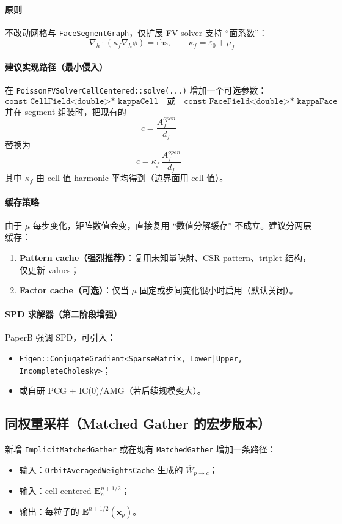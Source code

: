 \documentclass[UTF8,a4paper,12pt]{ctexart}
\newcommand{\code}[1]{\texttt{#1}}
\begin{document}
\paragraph{原则}
不改动网格与 \code{FaceSegmentGraph}，仅扩展 FV solver 支持 ``面系数''：
\[
  -\nabla_h\cdot\left( \kappa_f \nabla_h \phi \right) = \mathrm{rhs},
  \qquad \kappa_f = \varepsilon_0 + \mu_f
\]

\paragraph{建议实现路径（最小侵入）}
在 \code{PoissonFVSolverCellCentered::solve(...)} 增加一个可选参数：
\[
\code{const CellField<double>* kappaCell} \quad \text{或}\quad \code{const FaceField<double>* kappaFace}
\]
并在 segment 组装时，把现有的
\[
c=\frac{A_f^{open}}{d_f}
\]
替换为
\[
c=\kappa_f\,\frac{A_f^{open}}{d_f}
\]
其中 $\kappa_f$ 由 cell 值 harmonic 平均得到（边界面用 cell 值）。

\paragraph{缓存策略}
由于 $\mu$ 每步变化，矩阵数值会变，直接复用 ``数值分解缓存'' 不成立。建议分两层缓存：
\begin{enumerate}[leftmargin=2em]
  \item \textbf{Pattern cache（强烈推荐）}：复用未知量映射、CSR pattern、triplet 结构，仅更新 values；
  \item \textbf{Factor cache（可选）}：仅当 $\mu$ 固定或步间变化很小时启用（默认关闭）。
\end{enumerate}

\paragraph{SPD 求解器（第二阶段增强）}
PaperB 强调 SPD，可引入：
\begin{itemize}[leftmargin=2em]
  \item \code{Eigen::ConjugateGradient<SparseMatrix, Lower|Upper, IncompleteCholesky>}；
  \item 或自研 PCG + IC(0)/AMG（若后续规模变大）。
\end{itemize}

\subsection{同权重采样（Matched Gather 的宏步版本）}
新增 \code{ImplicitMatchedGather} 或在现有 \code{MatchedGather} 增加一条路径：
\begin{itemize}[leftmargin=2em]
  \item 输入：\code{OrbitAveragedWeightsCache} 生成的 $\overline{W}_{p\to c}$；
  \item 输入：cell-centered $\bm{E}_c^{n+1/2}$；
  \item 输出：每粒子的 $\bm{E}^{n+1/2}(\bm{x}_p)$。
\end{itemize}
\end{document}
